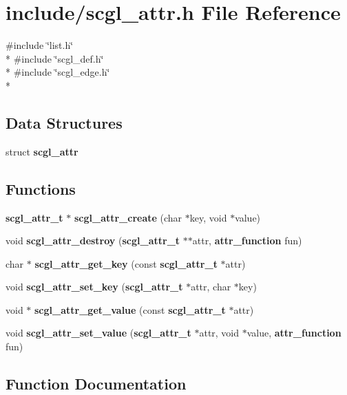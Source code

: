 \section{include/scgl\-\_\-attr.h File Reference}
\label{scgl__attr_8h}
{\ttfamily \#include \char`\"{}list.\-h\char`\"{}}\\*
{\ttfamily \#include \char`\"{}scgl\-\_\-def.\-h\char`\"{}}\\*
{\ttfamily \#include \char`\"{}scgl\-\_\-edge.\-h\char`\"{}}\\*
\subsection*{Data Structures}
\begin{DoxyCompactItemize}
\item 
struct {\bf scgl\-\_\-attr}
\end{DoxyCompactItemize}
\subsection*{Functions}
\begin{DoxyCompactItemize}
\item 
{\bf scgl\-\_\-attr\-\_\-t} $\ast$ {\bf scgl\-\_\-attr\-\_\-create} (char $\ast$key, void $\ast$value)
\item 
void {\bf scgl\-\_\-attr\-\_\-destroy} ({\bf scgl\-\_\-attr\-\_\-t} $\ast$$\ast$attr, {\bf attr\-\_\-function} fun)
\item 
char $\ast$ {\bf scgl\-\_\-attr\-\_\-get\-\_\-key} (const {\bf scgl\-\_\-attr\-\_\-t} $\ast$attr)
\item 
void {\bf scgl\-\_\-attr\-\_\-set\-\_\-key} ({\bf scgl\-\_\-attr\-\_\-t} $\ast$attr, char $\ast$key)
\item 
void $\ast$ {\bf scgl\-\_\-attr\-\_\-get\-\_\-value} (const {\bf scgl\-\_\-attr\-\_\-t} $\ast$attr)
\item 
void {\bf scgl\-\_\-attr\-\_\-set\-\_\-value} ({\bf scgl\-\_\-attr\-\_\-t} $\ast$attr, void $\ast$value, {\bf attr\-\_\-function} fun)
\end{DoxyCompactItemize}


\subsection{Function Documentation}

